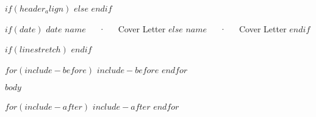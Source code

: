 \documentclass[$if(fontsize)$$fontsize$$else$11pt$endif$,$if(lang)$$babel-lang$,$endif$$if(papersize)$$papersize$$else$a4paper$endif$,$for(classoption)$$classoption$$sep$,$endfor$]{awesomecover}
\begin{document}
$if(header_align)$
$else$
\makecvheader[R]
$endif$

$if(date)$
\makecvfooter
  {$date$}
  {$name$~~~·~~~Cover Letter}
  {}
$else$
\makecvfooter
  {}
  {$name$~~~·~~~Cover Letter}
  {}
$endif$

\makelettertitle

\begin{cvletter}

$if(linestretch)$
$endif$

$for(include-before)$
$include-before$
$endfor$

$body$

$for(include-after)$
$include-after$
$endfor$
\end{cvletter}


\makeletterclosing
\end{document}
